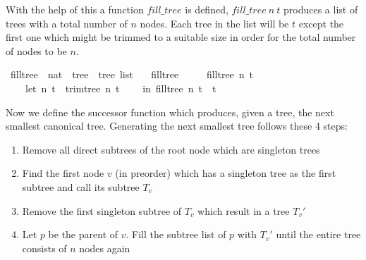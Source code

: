 With the help of this a function $fill\_tree$ is defined, $fill\_tree\ n\ t$ produces a list of trees with a total number of $n$ nodes.
Each tree in the list will be $t$ except the first one which might be trimmed to a suitable size in order for the total number of nodes to be $n$.

\begin{isabellebox}
    \isamarkupfalse%
\ fill{\isacharunderscore}{\kern0pt}tree\ {\isacharcolon}{\kern0pt}{\isacharcolon}{\kern0pt}\ {\isachardoublequoteopen}nat\ {\isasymRightarrow}\ tree\ {\isasymRightarrow}\ tree\ list{\isachardoublequoteclose}\ \isanewline
\ \ {\isachardoublequoteopen}fill{\isacharunderscore}{\kern0pt}tree\ {}\ {\isacharunderscore}{\kern0pt}\ {\isacharequal}{\kern0pt}\ {\isacharbrackleft}{\kern0pt}{\isacharbrackright}{\kern0pt}{\isachardoublequoteclose}\isanewline
{\isacharbar}{\kern0pt}\ {\isachardoublequoteopen}fill{\isacharunderscore}{\kern0pt}tree\ n\ t\ {\isacharequal}{\kern0pt}\isanewline
\ \ \ \ {\isacharparenleft}{\kern0pt}let\ {\isacharparenleft}{\kern0pt}n{\isacharprime}{\kern0pt}{\isacharcomma}{\kern0pt}\ t{\isacharprime}{\kern0pt}{\isacharparenright}{\kern0pt}\ {\isacharequal}{\kern0pt}\ trim{\isacharunderscore}{\kern0pt}tree\ n\ t\isanewline
\ \ \ \ in\ fill{\isacharunderscore}{\kern0pt}tree\ n{\isacharprime}{\kern0pt}\ t{\isacharprime}{\kern0pt}\ {\isacharat}{\kern0pt}\ {\isacharbrackleft}{\kern0pt}t{\isacharprime}{\kern0pt}{\isacharbrackright}{\kern0pt}{\isacharparenright}{\kern0pt}{\isachardoublequoteclose}
\end{isabellebox}

Now we define the successor function which produces, given a tree, the next smallest canonical tree.
Generating the next smallest tree follows these 4 steps:

\begin{enumerate}
    \item Remove all direct subtrees of the root node which are singleton trees
    \item Find the first node $v$ (in preorder) which has a singleton tree as the first subtree and call its subtree $T_v$
    \item Remove the first singleton subtree of $T_v$ which result in a tree $T_v'$
    \item Let $p$ be the parent of $v$. Fill the subtree list of $p$ with $T_v'$ until the entire tree consists of $n$ nodes again
\end{enumerate}

